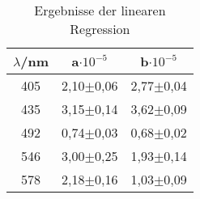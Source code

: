 \begin{table}[h]
	\begin{center}
		\begin{tabular}{c|cc}
			$\lambda$/nm&a$\cdot 10^{-5}$&b$\cdot 10^{-5}$ \\ \hline
			405&2,10$\pm$0,06&2,77$\pm$0,04\\
			435&3,15$\pm$0,14&3,62$\pm$0,09\\
			492&0,74$\pm$0,03&0,68$\pm$0,02\\
			546&3,00$\pm$0,25&1,93$\pm$0,14\\
			578&2,18$\pm$0,16&1,03$\pm$0,09
		\end{tabular}
		\caption{Ergebnisse der linearen Regression}
		\label{tabalinreg}
	\end{center}
\end{table}